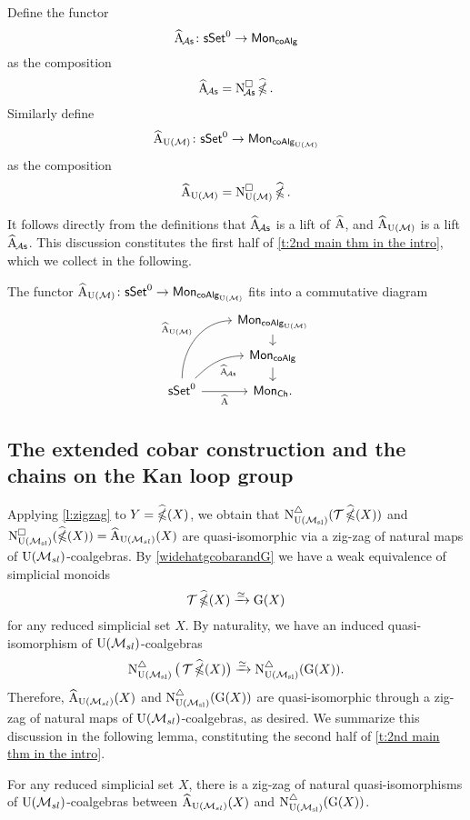Define the functor
\[
\adamsEA \colon \sSet^0 \to \Mon_{\coAlg}
\]
as the composition
\[
\adamsEA = \cchainsA \ccobarE.
\]
Similarly define
\[
\adamsE_{\UM} \colon \sSet^0 \to \Mon_{\coAlg_{\UM}}
\]
as the composition
\[
\adamsE_{\UM} = \cchainsUM \ccobarE.
\]

It follows directly from the definitions that $\adamsEA$ is a lift of $\adamsE$, and $\adamsE_{\UM}$ is a lift $\adamsEA$.
This discussion constitutes the first half of \cref{t:2nd main thm in the intro}, which we collect in the following.

\begin{lemma} \label{l:AhatUM}
	The functor $\adamsEUM \colon \sSet^0 \to \Mon_{\coAlg_\UM}$ fits into a commutative diagram
	\[
	\begin{tikzcd}[row sep=small]
		& \Mon_{\coAlg_\UM} \arrow[d] \\
		& \Mon_{\coAlg} \arrow[d] \\
		\sSet^0
		\arrow[r, "\adamsE"', ]
		\arrow[ru, "\adamsEA"', out=45, in=180]
		\arrow[ruu, "\adamsEUM", out=90, in=180]
		& \Mon_{\Ch}.
	\end{tikzcd}
	\]
\end{lemma}


\subsection{The extended cobar construction and the chains on the Kan loop group}

Applying \cref{l:zigzag} to $Y = \ccobarE(X)$, we obtain that $\schainsUSL (\triangulate \ccobarE(X))$ and $\cchainsUSL(\ccobarE(X)) = \adamsE_{\USL}(X)$ are quasi-isomorphic via a zig-zag of natural maps of $\USL$-coalgebras.
By \cref{widehatgcobarandG} we have a weak equivalence of simplicial monoids
\[
\triangulate \ccobarE(X) \xrightarrow{\simeq} \kan(X)
\]
for any reduced simplicial set $X$.
By naturality, we have an induced quasi-isomorphism of $\USL$-coalgebras
\[
\schainsUSL \big( \triangulate \ccobarE(X) \big) \xra{\simeq}
\schainsUSL (\kan(X)).
\]
Therefore, $\adamsE_{\USL}(X)$ and $\schainsUSL(\kan(X))$ are quasi-isomorphic through a zig-zag of natural maps of $\USL$-coalgebras, as desired.
We summarize this discussion in the following lemma, constituting the second half of \cref{t:2nd main thm in the intro}.

\begin{lemma}\label{l:AhatandGX}
	For any reduced simplicial set $X$, there is a zig-zag of natural quasi-isomorphisms of $\USL$-coalgebras between $\adamsE_\USL(X)$ and $\schainsUSL(\kan(X))$.
\end{lemma}